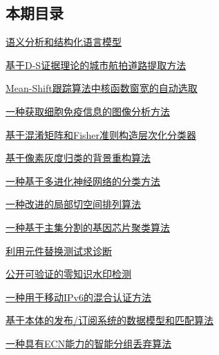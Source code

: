 \documentclass[a4paper]{article}
\begin{document}
\subsection{本期目录}
\href{http://www.jos.org.cn/ch/reader/download_pdf.aspx?file_no=20050901&year_id=2005&quarter_id=9&falg=1}{语义分析和结构化语言模型}

\href{http://www.jos.org.cn/ch/reader/download_pdf.aspx?file_no=20050902&year_id=2005&quarter_id=9&falg=1}{基于D-S证据理论的城市航拍道路提取方法}

\href{http://www.jos.org.cn/ch/reader/download_pdf.aspx?file_no=20050903&year_id=2005&quarter_id=9&falg=1}{Mean-Shift跟踪算法中核函数窗宽的自动选取}

\href{http://www.jos.org.cn/ch/reader/download_pdf.aspx?file_no=20050904&year_id=2005&quarter_id=9&falg=1}{一种获取细胞免疫信息的图像分析方法}

\href{http://www.jos.org.cn/ch/reader/download_pdf.aspx?file_no=20050905&year_id=2005&quarter_id=9&falg=1}{基于混淆矩阵和Fisher准则构造层次化分类器}

\href{http://www.jos.org.cn/ch/reader/download_pdf.aspx?file_no=20050906&year_id=2005&quarter_id=9&falg=1}{基于像素灰度归类的背景重构算法}

\href{http://www.jos.org.cn/ch/reader/download_pdf.aspx?file_no=20050907&year_id=2005&quarter_id=9&falg=1}{一种基于多进化神经网络的分类方法}

\href{http://www.jos.org.cn/ch/reader/download_pdf.aspx?file_no=20050908&year_id=2005&quarter_id=9&falg=1}{一种改进的局部切空间排列算法}

\href{http://www.jos.org.cn/ch/reader/download_pdf.aspx?file_no=20050909&year_id=2005&quarter_id=9&falg=1}{一种基于主集分割的基因芯片聚类算法}

\href{http://www.jos.org.cn/ch/reader/download_pdf.aspx?file_no=20050910&year_id=2005&quarter_id=9&falg=1}{利用元件替换测试求诊断}

\href{http://www.jos.org.cn/ch/reader/download_pdf.aspx?file_no=20050911&year_id=2005&quarter_id=9&falg=1}{公开可验证的零知识水印检测}

\href{http://www.jos.org.cn/ch/reader/download_pdf.aspx?file_no=20050912&year_id=2005&quarter_id=9&falg=1}{一种用于移动IPv6的混合认证方法}

\href{http://www.jos.org.cn/ch/reader/download_pdf.aspx?file_no=20050913&year_id=2005&quarter_id=9&falg=1}{基于本体的发布/订阅系统的数据模型和匹配算法}

\href{http://www.jos.org.cn/ch/reader/download_pdf.aspx?file_no=20050914&year_id=2005&quarter_id=9&falg=1}{一种具有ECN能力的智能分组丢弃算法}
\end{document}
